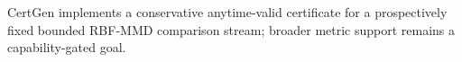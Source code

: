 CertGen implements a conservative anytime-valid certificate for a prospectively
fixed bounded RBF-MMD comparison stream; broader metric support remains a
capability-gated goal.
